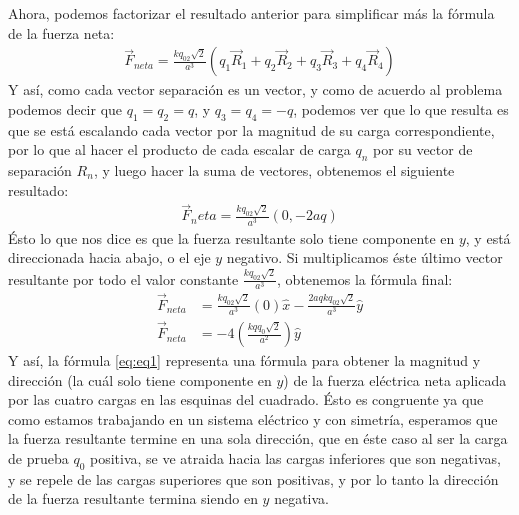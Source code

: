 \documentclass[12pt, letterpaper]{report}
\begin{document}
Ahora, podemos factorizar el resultado anterior para simplificar más la fórmula de la fuerza neta:
\begin{align}
\vec{F}_{neta} = \frac{kq_02\sqrt{2}}{a^3}(q_1 \vec{R}_1 + q_2 \vec{R}_2 + q_3 \vec{R}_3 + q_4 \vec{R}_4)
\end{align}
Y así, como cada vector separación es un vector, y como de acuerdo al problema podemos decir que $q_1 = q_2 = q$, y $q_3 = q_4 = -q$, podemos ver que lo que resulta es que se está escalando cada vector por la magnitud de su carga correspondiente, por lo que al hacer 
el producto de cada escalar de carga $q_n$ por su vector de separación $R_n$, y luego hacer la suma de vectores, obtenemos el siguiente resultado: 
\begin{align}
\vec{F}_neta = \frac{kq_02\sqrt{2}}{a^3}(0, -2aq)
\end{align}Ésto lo que nos dice es que la fuerza resultante solo tiene componente en $y$, y está direccionada hacia abajo, o el eje $y$ negativo. Si multiplicamos éste último vector resultante por todo el valor constante $\frac{kq_02\sqrt{2}}{a^3}$, obtenemos 
la fórmula final: 
\begin{align}
    \vec{F}_{neta} &= \frac{kq_02\sqrt{2}}{a^3}(0)\hat{x} - \frac{2aqkq_02\sqrt{2}}{a^3}\hat{y}\\
    \vec{F}_{neta} &= -4(\frac{kqq_0\sqrt{2}}{a^2})\hat{y}
    \label{eq:eq1}
\end{align}Y así, la fórmula \ref{eq:eq1} representa una fórmula para obtener la magnitud y dirección (la cuál solo tiene componente en $y$) de la 
fuerza eléctrica neta aplicada por las cuatro cargas en las esquinas del cuadrado. Ésto es congruente ya que como estamos trabajando en un sistema eléctrico y con simetría, 
esperamos que la fuerza resultante termine en una sola dirección, que en éste caso al ser la carga de prueba $q_0$ positiva, se ve atraida hacia las cargas inferiores que son negativas, 
y se repele de las cargas superiores que son positivas, y por lo tanto la dirección de la fuerza resultante termina siendo en $y$ negativa. \\
\end{document}
